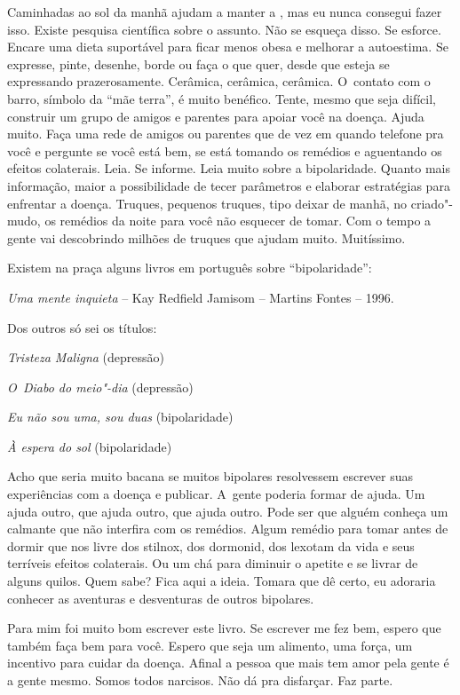 Caminhadas ao sol da manhã ajudam a manter a , mas eu nunca
consegui fazer isso. Existe pesquisa científica sobre o assunto. Não se
esqueça disso. Se esforce. Encare uma dieta suportável para ficar menos
obesa e melhorar a autoestima. Se expresse, pinte, desenhe, borde ou
faça o que quer, desde que esteja se expressando prazerosamente.
Cerâmica, cerâmica, cerâmica. O~contato com o barro, símbolo da ``mãe
terra'', é muito benéfico. Tente, mesmo que seja difícil, construir um
grupo de amigos e parentes para apoiar você na doença. Ajuda muito. Faça
uma rede de amigos ou parentes que de vez em quando telefone pra você e
pergunte se você está bem, se está tomando os remédios e aguentando os
efeitos colaterais. Leia. Se informe. Leia muito sobre a bipolaridade.
Quanto mais informação, maior a possibilidade de tecer parâmetros e
elaborar estratégias para enfrentar a doença. Truques, pequenos truques,
tipo deixar de manhã, no criado"-mudo, os remédios da noite para você não
esquecer de tomar. Com o tempo a gente vai descobrindo milhões de
truques que ajudam muito. Muitíssimo.

Existem na praça alguns livros em português sobre ``bipolaridade'':

\emph{Uma mente inquieta} -- Kay Redfield Jamisom -- Martins Fontes --
1996.

Dos outros só sei os títulos:

\emph{Tristeza Maligna} (depressão)

\emph{O~Diabo do meio"-dia} (depressão)

\emph{Eu não sou uma, sou duas} (bipolaridade)

\emph{À espera do sol} (bipolaridade)

Acho que seria muito bacana se muitos bipolares resolvessem escrever
suas experiências com a doença e publicar. A~gente poderia formar 
  de ajuda. Um ajuda outro, que ajuda outro, que ajuda outro.
Pode ser que alguém conheça um calmante que não interfira com os
remédios. Algum remédio para tomar antes de dormir que nos livre dos
stilnox, dos dormonid, dos lexotam da vida e seus terríveis efeitos
colaterais. Ou um chá para diminuir o apetite e se livrar de alguns
quilos. Quem sabe? Fica aqui a ideia. Tomara que dê certo, eu adoraria
conhecer as aventuras e desventuras de outros bipolares.

Para mim foi muito bom escrever este livro. Se escrever me fez bem,
espero que também faça bem para você. Espero que seja um alimento, uma
força, um incentivo para cuidar da doença. Afinal a pessoa que mais tem
amor pela gente é a gente mesmo. Somos todos narcisos. Não dá pra
disfarçar. Faz parte.

